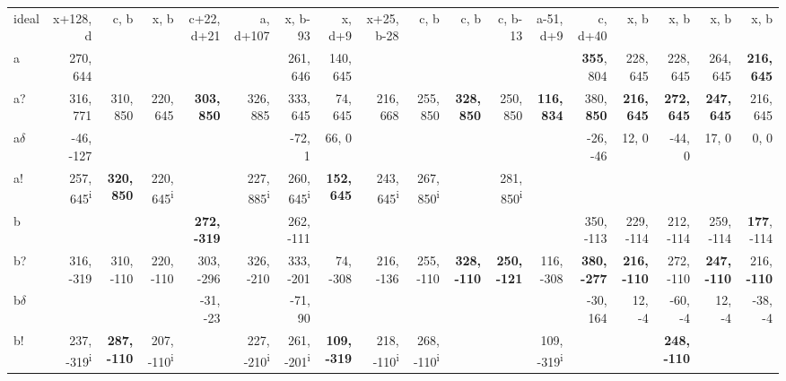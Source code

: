 \begin{table}[p]
{\begin{tabular}{lrrrrrrrrrrrrrrrrr}
ideal & x+128, d & c, b & x, b & c+22, d+21 & a, d+107 & x, b-93 & x, d+9 & x+25, b-28 & c, b & c, b & c, b-13 & a-51, d+9 & c, d+40 & x, b & x, b & x, b & x, b \\
a & 270, 644 &  &  &  &  & 261, 646 & 140, 645 &  &  &  &  &  & \textbf{355}, 804 & 228, 645 & 228, 645 & 264, 645 & \textbf{216, 645} \\
a? & 316, 771 & 310, 850 & 220, 645 & \textbf{303, 850} & 326, 885 & 333, 645 & 74, 645 & 216, 668 & 255, 850 & \textbf{328, 850} & 250, 850 & \textbf{116, 834} & 380, \textbf{850} & \textbf{216, 645} & \textbf{272, 645} & \textbf{247, 645} & 216, 645 \\
a$\delta$ & -46, -127 &  &  &  &  & -72, 1 & 66, 0 &  &  &  &  &  & -26, -46 & 12, 0 & -44, 0 & 17, 0 & 0, 0 \\
a! & 257, 645\textsuperscript{i} & \textbf{320, 850} & 220, 645\textsuperscript{i} &  & 227, 885\textsuperscript{i} & 260, 645\textsuperscript{i} & \textbf{152, 645} & 243, 645\textsuperscript{i} & 267, 850\textsuperscript{i} &  & 281, 850\textsuperscript{i} &  &  &  &  &  &  \\
b &  &  &  & \textbf{272, -319} &  & 262, -111 &  &  &  &  &  &  & 350, -113 & 229, -114 & 212, -114 & 259, -114 & \textbf{177}, -114 \\
b? & 316, -319 & 310, -110 & 220, -110 & 303, -296 & 326, -210 & 333, -201 & 74, -308 & 216, -136 & 255, -110 & \textbf{328, -110} & \textbf{250, -121} & 116, -308 & \textbf{380, -277} & \textbf{216, -110} & 272, -110 & \textbf{247, -110} & 216, \textbf{-110} \\
b$\delta$ &  &  &  & -31, -23 &  & -71, 90 &  &  &  &  &  &  & -30, 164 & 12, -4 & -60, -4 & 12, -4 & -38, -4 \\
b! & 237, -319\textsuperscript{i} & \textbf{287, -110} & 207, -110\textsuperscript{i} &  & 227, -210\textsuperscript{i} & 261, -201\textsuperscript{i} & \textbf{109, -319} & 218, -110\textsuperscript{i} & 268, -110\textsuperscript{i} &  &  & 109, -319\textsuperscript{i} &  &  & \textbf{248, -110} &  &  \\

\end{tabular}}
\end{table}
